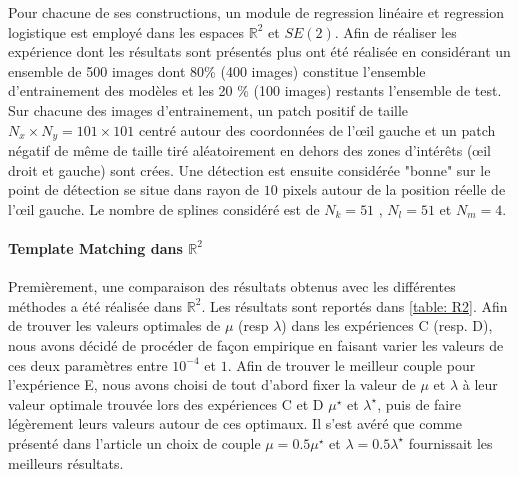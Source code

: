 \documentclass{article}
\begin{document}
Pour chacune de ses constructions, un module de regression linéaire et regression logistique est employé dans 
les espaces $\mathbb{R}^2$ et $SE(2)$. Afin de réaliser les expérience dont les résultats sont présentés plus 
ont été réalisée en considérant un ensemble de 500 images dont 80\% (400 images) constitue l'ensemble d'entrainement 
des modèles et les 20 \% (100 images) restants l'ensemble de test.
Sur chacune des images d'entrainement, un patch 
positif de taille $N_x \times N_y = 101 \times 101$ centré autour des coordonnées de l'œil gauche et un patch négatif 
de même de taille tiré aléatoirement en dehors des zones d'intérêts (œil droit et gauche) sont crées. Une détection est 
ensuite considérée "bonne" sur le point de détection se situe dans rayon de $10$ pixels autour de la position réelle de l'œil 
gauche. Le nombre de splines considéré est de $N_k = 51$ , $N_l =51$ et $N_m = 4$.



\paragraph{Template Matching dans $\mathbb{R}^2$}
Premièrement, une comparaison des résultats obtenus avec les différentes méthodes a été réalisée dans $\mathbb{R}^2$.
Les résultats sont reportés dans \ref{table: R2}. Afin de trouver les valeurs optimales de $\mu$ (resp $\lambda$) dans les expériences C (resp. D), nous avons décidé 
de procéder de façon empirique en faisant varier les valeurs de ces deux paramètres entre $10^{-4}$ et $1$. Afin de trouver le meilleur couple pour l'expérience E, nous avons 
choisi de tout d'abord fixer la valeur de $\mu$ et $\lambda$ à leur valeur optimale
trouvée lors des expériences C et D $ {\mu}^{\star}$ et $ {\lambda}^{\star}$, puis de faire légèrement leurs valeurs autour de ces optimaux.
Il s'est avéré que comme présenté dans l'article un choix de couple $\mu = 0.5
{\mu}^{\star}$ et $\lambda = 0.5 {\lambda}^{\star}$ fournissait les meilleurs résultats.
\end{document}
